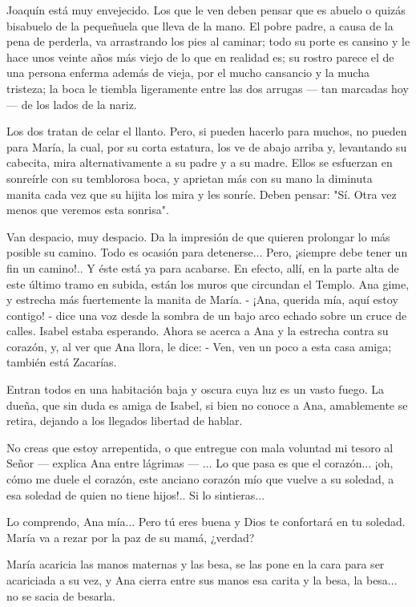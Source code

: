 \documentclass[12pt, twoside, openright]{book} %
\begin{document}
Joaquín está muy envejecido. Los que le ven deben pensar que es abuelo o quizás bisabuelo de la pequeñuela que lleva de la mano. El pobre padre, a causa de la pena de perderla, va arrastrando los pies al caminar; todo su porte es cansino y le hace unos veinte años más viejo de lo que en realidad es; su rostro parece el de una persona enferma además de vieja, por el mucho cansancio y la mucha tristeza; la boca le tiembla ligeramente entre las dos arrugas — tan marcadas hoy — de los lados de la nariz. 

Los dos tratan de celar el llanto. Pero, si pueden hacerlo para muchos, no pueden para María, la cual, por su corta estatura, los ve de abajo arriba y, levantando su cabecita, mira alternativamente a su padre y a su madre. Ellos se esfuerzan en sonreírle con su temblorosa boca, y aprietan más con su mano la diminuta manita cada vez que su hijita los mira y les sonríe. Deben pensar: "Sí. Otra vez menos que veremos esta sonrisa". 

Van despacio, muy despacio. Da la impresión de que quieren prolongar lo más posible su camino. Todo es ocasión para detenerse... Pero, ¡siempre debe tener un fin un camino!.. Y éste está ya para acabarse. En efecto, allí, en la parte alta de este último tramo en subida, están los muros que circundan el Templo. Ana gime, y estrecha más fuertemente la manita de María. - ¡Ana, querida mía, aquí estoy contigo! - dice una voz desde la sombra de un bajo arco echado sobre un cruce de calles. Isabel estaba esperando. Ahora se acerca a Ana y la estrecha contra su corazón, y, al ver que Ana llora, le dice: - Ven, ven un poco a esta casa amiga; también está Zacarías. 

Entran todos en una habitación baja y oscura cuya luz es un vasto fuego. La dueña, que sin duda es amiga de Isabel, si bien no conoce a Ana, amablemente se retira, dejando a los llegados libertad de hablar. 

No creas que estoy arrepentida, o que entregue con mala voluntad mi tesoro al Señor — explica Ana entre lágrimas — ... Lo que pasa es que el corazón... ¡oh, cómo me duele el corazón, este anciano corazón mío que vuelve a su soledad, a esa soledad de quien no tiene hijos!.. Si lo sintieras... 

Lo comprendo, Ana mía... Pero tú eres buena y Dios te confortará en tu soledad. María va a rezar por la paz de su mamá, ¿verdad? 

María acaricia las manos maternas y las besa, se las pone en la cara para ser acariciada a su vez, y Ana cierra entre sus manos esa carita y la besa, la besa... no se sacia de besarla. 
\end{document}
